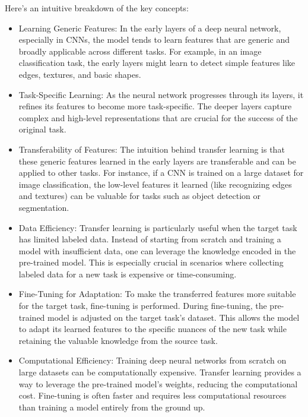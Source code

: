 \documentclass{report}
\begin{document}
Here's an intuitive breakdown of the key concepts:

\begin{itemize}
\item Learning Generic Features:
In the early layers of a deep neural network, especially in CNNs, the model tends to learn features that are generic and broadly applicable across different tasks. For example, in an image classification task, the early layers might learn to detect simple features like edges, textures, and basic shapes.

\item Task-Specific Learning:
As the neural network progresses through its layers, it refines its features to become more task-specific. The deeper layers capture complex and high-level representations that are crucial for the success of the original task.

\item Transferability of Features:
The intuition behind transfer learning is that these generic features learned in the early layers are transferable and can be applied to other tasks. For instance, if a CNN is trained on a large dataset for image classification, the low-level features it learned (like recognizing edges and textures) can be valuable for tasks such as object detection or segmentation.

\item Data Efficiency:
Transfer learning is particularly useful when the target task has limited labeled data. Instead of starting from scratch and training a model with insufficient data, one can leverage the knowledge encoded in the pre-trained model. This is especially crucial in scenarios where collecting labeled data for a new task is expensive or time-consuming.

\item Fine-Tuning for Adaptation:
To make the transferred features more suitable for the target task, fine-tuning is performed. During fine-tuning, the pre-trained model is adjusted on the target task's dataset. This allows the model to adapt its learned features to the specific nuances of the new task while retaining the valuable knowledge from the source task.

\item Computational Efficiency:
Training deep neural networks from scratch on large datasets can be computationally expensive. Transfer learning provides a way to leverage the pre-trained model's weights, reducing the computational cost. Fine-tuning is often faster and requires less computational resources than training a model entirely from the ground up.
\end{itemize}
\end{document}
